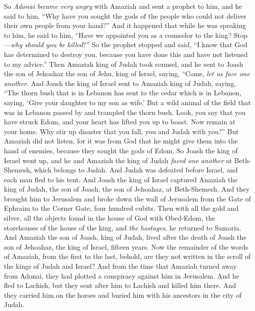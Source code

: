 \begin{biblechapter}
\verse So \textit{Adonai became very angry} with Amaziah and sent a prophet to him, and he said to him, “Why have you sought the gods of the people who could not deliver their own people from your hand?”
\verse And it happened that while he was speaking to him, he said to him, “Have we appointed you as a counselor to the king? Stop—\textit{why should you be killed}?” So the prophet stopped and said, “I know that God has determined to destroy you, because you have done this and have not listened to my advice.”
\verse Then Amaziah king of Judah took counsel, and he sent to Joash the son of Jehoahaz the son of Jehu, king of Israel, saying, “Come, \textit{let us face one another}.
\verse And Joash the king of Israel sent to Amaziah king of Judah, saying, “The thorn bush that is in Lebanon has sent to the cedar which is in Lebanon, saying, ‘Give your daughter to my son as wife.’ But a wild animal of the field that was in Lebanon passed by and trampled the thorn bush.
\verse Look, you say that you have struck Edom, and your heart has lifted you up to boast. Now remain at your home. Why stir up disaster that you fall, you and Judah with you?”
\verse But Amaziah did not listen, for it was from God that he might give them into the hand of enemies, because they sought the gods of Edom.
\verse So Joash the king of Israel went up, and he and Amaziah the king of Judah \textit{faced one another} at Beth-Shemesh, which belongs to Judah.
\verse And Judah was defeated before Israel, and each man fled to his tent.
\verse And Joash the king of Israel captured Amaziah the king of Judah, the son of Joash, the son of Jehoahaz, at Beth-Shemesh. And they brought him to Jerusalem and broke down the wall of Jerusalem from the Gate of Ephraim to the Corner Gate, four hundred cubits.
\verse Then with all the gold and silver, all the objects found in the house of God with Obed-Edom, the storehouses of the house of the king, and \textit{the hostages}, he returned to Samaria.
\verse And Amaziah the son of Joash, king of Judah, lived after the death of Joash the son of Jehoahaz, the king of Israel, fifteen years.
\verse Now the remainder of the words of Amaziah, from the first to the last, behold, are they not written in the scroll of the kings of Judah and Israel?
\verse And from the time that Amaziah turned away from Adonai, they had plotted a conspiracy against him in Jerusalem. And he fled to Lachish, but they sent after him to Lachish and killed him there.
\verse And they carried him on the horses and buried him with his ancestors in the city of Judah.
\end{biblechapter}

